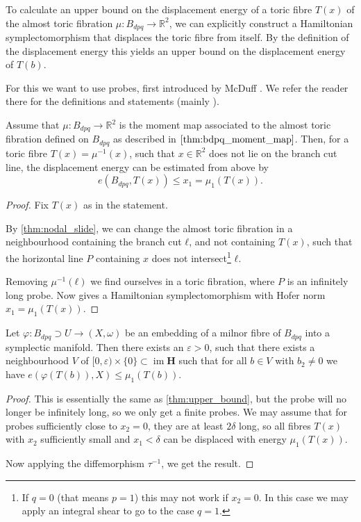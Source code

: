 \documentclass[12pt,a4paper,draft]{scrartcl}
\DeclareMathOperator{\im}{im}
\begin{document}
To calculate an upper bound on the displacement energy of a toric fibre $T(x)$ of the almost toric fibration $\mu \colon B_{dpq}\to \mathbb{R}^2$, we can explicitly construct a Hamiltonian symplectomorphism that displaces the toric fibre from itself.
By the definition of the displacement energy this yields an upper bound on the displacement energy of $T(b)$.

For this we want to use probes, first introduced by McDuff \cite{mcduff2011displacing}. We refer the reader there for the definitions and statements (mainly \cite[Definition 2.3, Lemma 2.4]{mcduff2011displacing}).


\begin{lemma}
    \label{thm:upper_bound}
    Assume that $\mu \colon B_{dpq} \to \mathbb{R}^2$ is the moment map associated to the almost toric fibration defined on $B_{dpq}$ as described in $\cref{thm:bdpq_moment_map}$. 
    Then, for a toric fibre $T(x)=\mu^{-1}(x)$, such that $x \in \mathbb{R}^2$ does not lie on the branch cut line, the displacement energy can be estimated from above by
    \[ e(B_{dpq},T(x))\leq x_1 = μ_1(T(x)). \]
\end{lemma}


\begin{proof}
  Fix $T(x)$ as in the statement.
  
By \cref{thm:nodal_slide}, we can change the almost toric fibration in a neighbourhood containing the branch cut $ℓ$, and not containing $T(x)$, such that the horizontal line $P$ containing $x$ does not intersect\footnote{If $q=0$ (that means $p=1$) this may not work if $x_2=0$. In this case we may apply an integral shear to go to the case $q=1$.} $ℓ$.

Removing $μ^{-1}(ℓ)$ we find ourselves in a toric fibration, where $P$ is an infinitely long probe. Now \cite[Lemma 2.4]{mcduff2011displacing} gives a Hamiltonian symplectomorphism with Hofer norm $x_1 = μ_1(T(x))$.
\end{proof}

\begin{proposition}
\label{thm:upper_bound_embedded}
  Let $φ:B_{dpq} ⊃ U → (X,ω)$ be an embedding of a milnor fibre of $B_{dpq}$ into a symplectic manifold.
  Then there exists an $ε>0$, such that there exists a neighbourhood $V$ of $[0,ε) × \{0\} ⊂ \im{\symbf{H}}$ such that for all $b ∈ V$ with $b_2 ≠ 0$ we have $e(φ(T(b)),X) \leq μ_1(T(b))$.
\end{proposition}

\begin{proof}
    This is essentially the same as \cref{thm:upper_bound}, but the probe will no longer be infinitely long, so we only get a finite probes.
    We may assume that for probes sufficiently close to $x_2=0$, they are at least $2δ$ long, so all fibres $T(x)$ with $x_2$ sufficiently small and $x_1<δ$ can be displaced with energy $μ_1(T(x))$.

    Now applying the diffemorphism $τ^{-1}$, we get the result.
\end{proof}
\end{document}
